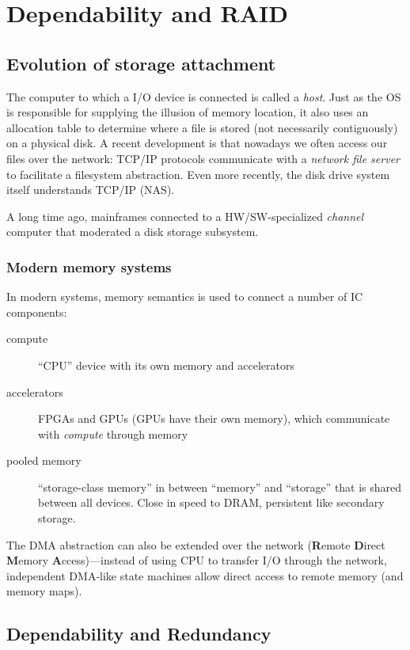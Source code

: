 \chapter{Dependability and RAID}
\section{Evolution of storage attachment}
The computer to which a I/O device is connected is called a \emph{host}.
Just as the OS is responsible for supplying the illusion of memory location, it also uses an allocation table to determine where
a file is stored (not necessarily contiguously) on a physical disk.
A recent development is that nowadays we often access our files over the network: TCP/IP protocols communicate with a \emph{network file server} to facilitate a filesystem abstraction.
Even more recently, the disk drive system itself understands TCP/IP (NAS).

A long time ago, mainframes connected to a HW/SW-specialized \emph{channel} computer that moderated a disk storage subsystem.

\subsection{Modern memory systems}
In modern systems, memory semantics is used to connect a number of IC components:
\begin{description}
	\item[compute] ``CPU'' device with its own memory and accelerators
	\item[accelerators] FPGAs and GPUs (GPUs have their own memory), which communicate with \emph{compute} through memory
	\item[pooled memory] ``storage-class memory'' in between ``memory'' and ``storage'' that is shared between all devices.
	Close in speed to DRAM, persistent like secondary storage.
\end{description}

The DMA abstraction can also be extended over the network (\textbf{R}emote \textbf{D}irect \textbf{M}emory \textbf{A}ccess)---instead of using CPU to transfer I/O through the network, independent DMA-like state machines allow direct access to remote memory (and memory maps).

\section{Dependability and Redundancy}

